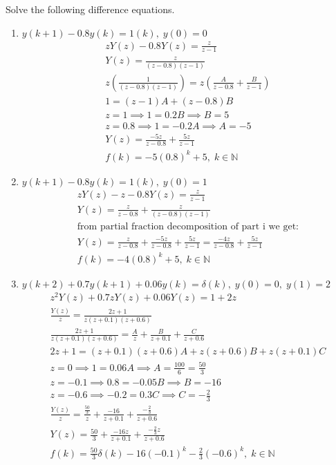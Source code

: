 \documentclass[12pt]{article}
\newcommand{\N}{\mathbb{N}}
\newenvironment{problem}[2][Problem]{\begin{trivlist}
\item[\hskip \labelsep {\bfseries #1}\hskip \labelsep {\bfseries #2.}]}{\end{trivlist}}
\begin{document}
\begin{problem}{3}
    Solve the following difference equations.
    \begin{enumerate}[label=\roman*]
        \item $y(k+1)-0.8y(k) = 1(k),\;y(0)=0$\\
        \begin{align*}
            zY(z)-0.8Y(z)=\frac{z}{z-1}\\
            Y(z)=\frac{z}{(z-0.8)(z-1)}\\
            z\left(\frac{1}{(z-0.8)(z-1)}\right)=z\left(\frac{A}{z-0.8}+\frac{B}{z-1}\right)\\
            1 = (z-1)A + (z-0.8)B\\
            z=1\implies 1=0.2B \implies B=5\\
            z=0.8\implies 1=-0.2A \implies A=-5\\
            Y(z)=\frac{-5z}{z-0.8} + \frac{5z}{z-1}\\
            f(k)=-5(0.8)^k + 5,\;k\in \N
        \end{align*}
        \item $y(k+1) - 0.8y(k)=1(k),\;y(0)=1$\\
        \begin{align*}
            zY(z)-z-0.8Y(z)=\frac{z}{z-1}\\
            Y(z)=\frac{z}{z-0.8}+\frac{z}{(z-0.8)(z-1)}\\
            \text{from partial fraction decomposition of part i we get:}\\
            Y(z)=\frac{z}{z-0.8}+\frac{-5z}{z-0.8} + \frac{5z}{z-1}=\frac{-4z}{z-0.8} + \frac{5z}{z-1}\\
            f(k)=-4(0.8)^k + 5,\;k\in \N
        \end{align*}
        \pagebreak
        \item $y(k+2)+0.7y(k+1)+0.06y(k)=\delta(k),\; y(0)=0,\;y(1)=2$\\
        \begin{align*}
            z^2Y(z)+0.7zY(z)+0.06Y(z)=1+2z\\
            \frac{Y(z)}{z}=\frac{2z+1}{z(z+0.1)(z+0.6)}\\
            \frac{2z+1}{z(z+0.1)(z+0.6)} = \frac{A}{z} + \frac{B}{z+0.1}+\frac{C}{z+0.6}\\
            2z+1=(z+0.1)(z+0.6)A+z(z+0.6)B+z(z+0.1)C\\
            z=0\implies 1 = 0.06A \implies A = \frac{100}{6}=\frac{50}{3}\\
            z=-0.1\implies 0.8 = -0.05B \implies B = -16\\
            z=-0.6\implies -0.2 = 0.3C\implies C = -\frac{2}{3}\\
            \frac{Y(z)}{z}=\frac{\frac{50}{3}}{z} + \frac{-16}{z+0.1} + \frac{-\frac{2}{3}}{z+0.6}\\
            Y(z)=\frac{50}{3} +\frac{-16z}{z+0.1}+\frac{-\frac{2}{3}z}{z+0.6}\\
            f(k)=\frac{50}{3}\delta(k) -16(-0.1)^k-\frac{2}{3}(-0.6)^k,\;k\in \N
        \end{align*}
    \end{enumerate}
\end{problem}
\end{document}
